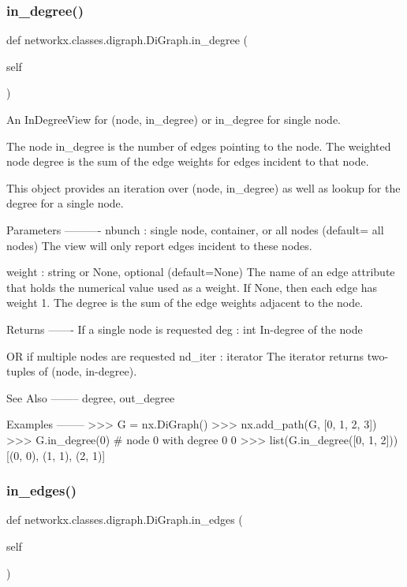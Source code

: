 \subsubsection{\texorpdfstring{in\+\_\+degree()}{in\_degree()}}
{\footnotesize\ttfamily def networkx.\+classes.\+digraph.\+Di\+Graph.\+in\+\_\+degree (\begin{DoxyParamCaption}\item[{}]{self }\end{DoxyParamCaption})}

\begin{DoxyVerb}An InDegreeView for (node, in_degree) or in_degree for single node.

The node in_degree is the number of edges pointing to the node.
The weighted node degree is the sum of the edge weights for
edges incident to that node.

This object provides an iteration over (node, in_degree) as well as
lookup for the degree for a single node.

Parameters
----------
nbunch : single node, container, or all nodes (default= all nodes)
    The view will only report edges incident to these nodes.

weight : string or None, optional (default=None)
   The name of an edge attribute that holds the numerical value used
   as a weight.  If None, then each edge has weight 1.
   The degree is the sum of the edge weights adjacent to the node.

Returns
-------
If a single node is requested
deg : int
    In-degree of the node

OR if multiple nodes are requested
nd_iter : iterator
    The iterator returns two-tuples of (node, in-degree).

See Also
--------
degree, out_degree

Examples
--------
>>> G = nx.DiGraph()
>>> nx.add_path(G, [0, 1, 2, 3])
>>> G.in_degree(0)  # node 0 with degree 0
0
>>> list(G.in_degree([0, 1, 2]))
[(0, 0), (1, 1), (2, 1)]\end{DoxyVerb}
 \mbox{\label{classnetworkx_1_1classes_1_1digraph_1_1DiGraph_a6da61e2c6bc041cd67c928e62986b828}} 
\subsubsection{\texorpdfstring{in\+\_\+edges()}{in\_edges()}}
{\footnotesize\ttfamily def networkx.\+classes.\+digraph.\+Di\+Graph.\+in\+\_\+edges (\begin{DoxyParamCaption}\item[{}]{self }\end{DoxyParamCaption})}

